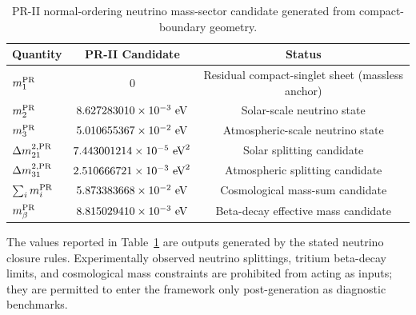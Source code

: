 \documentclass[11pt]{article}
\renewcommand{\arraystretch}{1.22}
\renewcommand{\arraystretch}{1.4}
\begin{document}
\begin{table}[ht!]
\centering
\caption{PR-II normal-ordering neutrino mass-sector candidate generated from compact-boundary geometry.}
\label{tab:pr2_neutrino_mass_candidate_main}
\small
\renewcommand{\arraystretch}{1.25}
\begin{tabular}{lcc}
\hline\hline
\textbf{Quantity} & \textbf{PR-II Candidate} & \textbf{Status} \\ \hline
$m_1^{\rm PR}$ 
& $0$ 
& Residual compact-singlet sheet (massless anchor) \\

$m_2^{\rm PR}$ 
& $8.627283010\times10^{-3}\ {\rm eV}$ 
& Solar-scale neutrino state \\

$m_3^{\rm PR}$ 
& $5.010655367\times10^{-2}\ {\rm eV}$ 
& Atmospheric-scale neutrino state \\

$\Delta m_{21}^{2,{\rm PR}}$ 
& $7.443001214\times10^{-5}\ {\rm eV}^2$ 
& Solar splitting candidate \\

$\Delta m_{31}^{2,{\rm PR}}$ 
& $2.510666721\times10^{-3}\ {\rm eV}^2$ 
& Atmospheric splitting candidate \\

$\sum_i m_i^{\rm PR}$ 
& $5.873383668\times10^{-2}\ {\rm eV}$ 
& Cosmological mass-sum candidate \\

$m_\beta^{\rm PR}$ 
& $8.815029410\times10^{-3}\ {\rm eV}$ 
& Beta-decay effective mass candidate \\ \hline\hline
\end{tabular}
\end{table}

The values reported in Table~\ref{tab:pr2_neutrino_mass_candidate_main} are outputs generated by the stated neutrino closure rules. Experimentally observed neutrino splittings, tritium beta-decay limits, and cosmological mass constraints are prohibited from acting as inputs; they are permitted to enter the framework only post-generation as diagnostic benchmarks.
\end{document}
